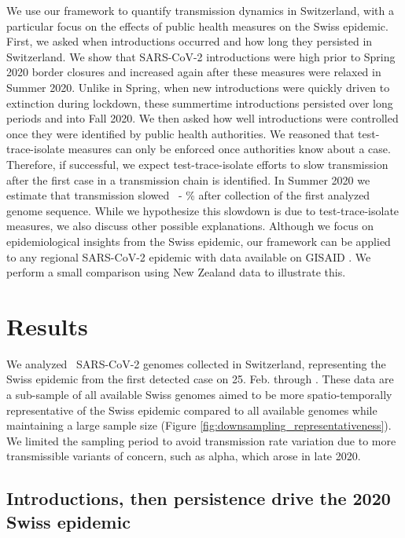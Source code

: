 \documentclass[9pt,twoside,lineno]{pnas-new} %
\begin{document}
We use our framework to quantify transmission dynamics in Switzerland, with a particular focus on the effects of public health measures on the Swiss epidemic. First, we asked when introductions occurred and how long they persisted in Switzerland. We show that SARS-CoV-2 introductions were high prior to Spring 2020 border closures and increased again after these measures were relaxed in Summer 2020. Unlike in Spring, when new introductions were quickly driven to extinction during lockdown, these summertime introductions persisted over long periods and into Fall 2020. We then asked how well introductions were controlled once they were identified by public health authorities. We reasoned that test-trace-isolate measures can only be enforced once authorities know about a case. Therefore, if successful, we expect test-trace-isolate efforts to slow transmission after the first case in a transmission chain is identified. In Summer 2020 we estimate that transmission slowed \summermaxdampingpercentmedianCHEnosampUB\ - \summermindampingpercentmedianCHEnosampUB\% after collection of the first analyzed genome sequence. While we hypothesize this slowdown is due to test-trace-isolate measures, we also discuss other possible explanations. Although we focus on epidemiological insights from the Swiss epidemic, our framework can be applied to any regional SARS-CoV-2 epidemic with data available on GISAID \cite{GISAID}. We perform a small comparison using New Zealand data to illustrate this. 

\section{Results}
We analyzed \nfocalsamples\ SARS-CoV-2 genomes collected in Switzerland, representing the Swiss epidemic from the first detected case on 25. Feb. through \maxdate. These data are a sub-sample of all available Swiss genomes aimed to be more spatio-temporally representative of the Swiss epidemic compared to all available genomes while maintaining a large sample size (Figure  \ref{fig:downsampling_representativeness}). We limited the sampling period to avoid transmission rate variation due to more transmissible variants of concern, such as alpha, which arose in late 2020.

\subsection{Introductions, then persistence drive the 2020 Swiss epidemic}
\end{document}
